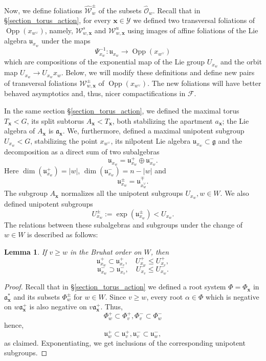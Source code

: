 \documentclass[12pt]{amsbook}%
\newtheorem{lem}[thm]{Lemma}
\theoremstyle{definition}
\theoremstyle{remark}
\numberwithin{section}{chapter}
\numberwithin{subsection}{section}
\numberwithin{figure}{chapter}
\DeclareMathOperator{\Opp}{Opp}
\def\cF{{\mathscr{F}}}
\def\cO{{\mathscr{O}}}
\def\cW{{\mathscr{W}}}
\def\cY{{\mathscr{Y}}}
\def\bx{\mathbf{x}}
\begin{document}
{{\medskip 
Now, we define foliations $\hat{\cW}_w^\pm$ of the subsets $\hat{\cO}_w$. Recall that in \S \ref{section_torus_action}, for every $\bx\in \cY$ we defined 
two transversal foliations of $\Opp(x_{w^\vee})$, namely, $\cW^s_{w,\bx}$ and $\cW^u_{w,\bx}$ using images of affine foliations of the Lie algebra 
$\mathfrak{u}_{x_w}$ under the maps 
$$
\Psi^{-1}_{x_w}:  \mathfrak{u}_{x_w}\to \Opp(x_{w^\vee})$$
which are compositions of the exponential map 
of the Lie group $U_{x_w}$ and the orbit map $U_{x_w}\to U_{x_w} x_w$. Below, we will modify these definitions and define new pairs of transversal foliations 
$\cW^\pm_{w,\bx}$ of $\Opp(x_{w^\vee})$. The new foliations will have better behaved asymptotics and, thus, nicer compactifications in $\cF$. 

\medskip

In the same section \S \ref{section_torus_action}, we defined the maximal torus $T_{\bx}< G$, its split subtorus $A_{\bx}< T_{\bx}$,  both 
stabilizing the apartment $a_{\bx}$;  the Lie algebra of $A_{\bx}$ is 
$\mathfrak{a}_{\bx}$. We, furthermore, defined a maximal unipotent subgroup $U_{x_w}< G$, stabilizing the point $x_{w^\vee}$, 
its nilpotent Lie algebra $\mathfrak{u}_{x_w}\subset \mathfrak{g}$ 
and the decomposition as a direct sum of two subalgebras
$$
\mathfrak{u}_{x_w}= \mathfrak{u}^+_{x_w} \oplus \mathfrak{u}^-_{x_w}. 
$$
Here  $\dim(\mathfrak{u}^+_{x_w})=|w|$, $\dim(\mathfrak{u}^-_{x_w})=n-|w|$ and  
$$
\mathfrak{u}^\pm_{x_w}= \mathfrak{u}^\mp_{x_w^\vee}.
$$ 
The subgroup $A_{\bx}$ normalizes all the unipotent subgroups $U_{x_w}, w\in W$. 
We also defined unipotent subgroups
$$
U^\pm_{x_w}:= \exp(\mathfrak{u}^\pm_{x_w})< U_{x_w}. 
$$
The relations between these subalgebras and subgroups under the change of $w\in W$ is described as follows:

\begin{lem}\label{lem:root-inclusions}
If $v\ge w$ in the Bruhat order on $W$, then  
\begin{equation}\label{eq:plus}
\mathfrak{u}^+_{x_w}\subset \mathfrak{u}^+_{x_v}, \quad U^+_{x_w}\leqslant U^+_{x_v}, 
\end{equation}
\begin{equation}\label{eq:minus}
\mathfrak{u}^-_{x_w}\supset \mathfrak{u}^-_{x_v},  \quad U^-_{x_v}\leqslant U^-_{x_w}. 
\end{equation}
\end{lem}
\begin{proof} Recall that in \S \ref{section_torus_action}  we defined a root system 
$\Phi=\Phi_{\bx}$ in ${\mathfrak a}_{\bx}^*$ and its  subsets $\Phi^\pm_{w}$ for $w\in W$.  
Since $v\ge w$, every root $\alpha\in \Phi$ which is negative on $w {\mathfrak a}_{\bx}^+$ 
 is also negative on $v{\mathfrak a}_{\bx}^+$. Thus,
\begin{equation}\label{eq:root-inclusion} 
\Phi_w^+\subset \Phi_v^+, \Phi_v^-\subset \Phi_w^-
\end{equation}
hence,
$$
{\mathfrak u}_w^+\subset {\mathfrak u}_v^+, {\mathfrak u}_v^-\subset {\mathfrak u}_w^-, 
$$
as claimed. Exponentiating, we get inclusions of the corresponding unipotent subgroups. 
\end{proof}

}}
\end{document}
